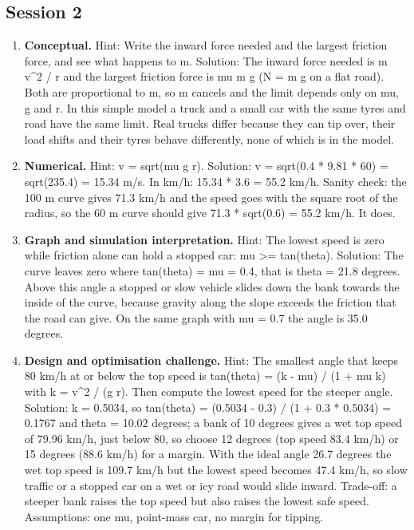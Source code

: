 \documentclass[11pt,a4paper]{article}
\begin{document}
\subsection*{Session 2}
\begin{enumerate}[nosep]
\item \textbf{Conceptual.} Hint: Write the inward force needed and the largest friction force, and see what happens to m. Solution: The inward force needed is m v\textasciicircum{}2 / r and the largest friction force is mu m g (N = m g on a flat road). Both are proportional to m, so m cancels and the limit depends only on mu, g and r. In this simple model a truck and a small car with the same tyres and road have the same limit. Real trucks differ because they can tip over, their load shifts and their tyres behave differently, none of which is in the model.
\item \textbf{Numerical.} Hint: v = sqrt(mu g r). Solution: v = sqrt(0.4 * 9.81 * 60) = sqrt(235.4) = 15.34 m/s. In km/h: 15.34 * 3.6 = 55.2 km/h. Sanity check: the 100 m curve gives 71.3 km/h and the speed goes with the square root of the radius, so the 60 m curve should give 71.3 * sqrt(0.6) = 55.2 km/h. It does.
\item \textbf{Graph and simulation interpretation.} Hint: The lowest speed is zero while friction alone can hold a stopped car: mu \textgreater{}= tan(theta). Solution: The curve leaves zero where tan(theta) = mu = 0.4, that is theta = 21.8 degrees. Above this angle a stopped or slow vehicle slides down the bank towards the inside of the curve, because gravity along the slope exceeds the friction that the road can give. On the same graph with mu = 0.7 the angle is 35.0 degrees.
\item \textbf{Design and optimisation challenge.} Hint: The smallest angle that keeps 80 km/h at or below the top speed is tan(theta) = (k - mu) / (1 + mu k) with k = v\textasciicircum{}2 / (g r). Then compute the lowest speed for the steeper angle. Solution: k = 0.5034, so tan(theta) = (0.5034 - 0.3) / (1 + 0.3 * 0.5034) = 0.1767 and theta = 10.02 degrees; a bank of 10 degrees gives a wet top speed of 79.96 km/h, just below 80, so choose 12 degrees (top speed 83.4 km/h) or 15 degrees (88.6 km/h) for a margin. With the ideal angle 26.7 degrees the wet top speed is 109.7 km/h but the lowest speed becomes 47.4 km/h, so slow traffic or a stopped car on a wet or icy road would slide inward. Trade-off: a steeper bank raises the top speed but also raises the lowest safe speed. Assumptions: one mu, point-mass car, no margin for tipping.
\end{enumerate}
\end{document}
